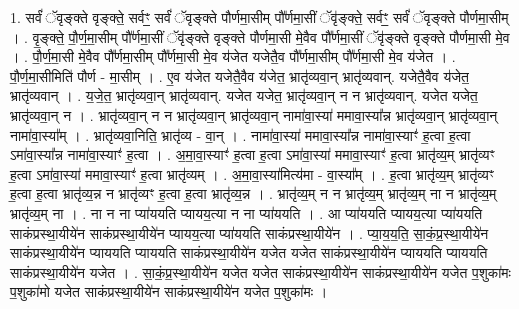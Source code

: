 \documentclass[17pt]{extarticle}
\begin{document}
1. सर्वं॑ ॅवृङ्क्ते वृङ्क्ते॒ सर्वꣳ॒॒ सर्वं॑ ॅवृङ्क्ते पौर्णमा॒सीम् पौ᳚र्णमा॒सीं ॅवृ॑ङ्क्ते॒ सर्वꣳ॒॒ सर्वं॑ ॅवृङ्क्ते पौर्णमा॒सीम् । . वृ॒ङ्क्ते॒ पौ॒र्ण॒मा॒सीम् पौ᳚र्णमा॒सीं ॅवृ॑ङ्क्ते वृङ्क्ते पौर्णमा॒सी मे॒वैव पौ᳚र्णमा॒सीं ॅवृ॑ङ्क्ते वृङ्क्ते पौर्णमा॒सी मे॒व । . पौ॒र्ण॒मा॒सी मे॒वैव पौ᳚र्णमा॒सीम् पौ᳚र्णमा॒सी मे॒व य॑जेत यजेतै॒व पौ᳚र्णमा॒सीम् पौ᳚र्णमा॒सी मे॒व य॑जेत । . पौ॒र्ण॒मा॒सीमिति॑ पौर्ण - मा॒सीम् । . ए॒व य॑जेत यजेतै॒वैव य॑जेत॒ भ्रातृ॑व्यवा॒न् भ्रातृ॑व्यवान्. यजेतै॒वैव य॑जेत॒ भ्रातृ॑व्यवान् । . य॒जे॒त॒ भ्रातृ॑व्यवा॒न् भ्रातृ॑व्यवान्. यजेत यजेत॒ भ्रातृ॑व्यवा॒न् न न भ्रातृ॑व्यवान्. यजेत यजेत॒ भ्रातृ॑व्यवा॒न् न । . भ्रातृ॑व्यवा॒न् न न भ्रातृ॑व्यवा॒न् भ्रातृ॑व्यवा॒न् नामा॑वा॒स्या॑ ममावा॒स्या᳚न्न भ्रातृ॑व्यवा॒न् भ्रातृ॑व्यवा॒न् नामा॑वा॒स्या᳚म् । . भ्रातृ॑व्यवा॒निति॒ भ्रातृ॑व्य - वा॒न् । . नामा॑वा॒स्या॑ ममावा॒स्या᳚न्न नामा॑वा॒स्याꣳ॑ ह॒त्वा ह॒त्वा ऽमा॑वा॒स्या᳚न्न नामा॑वा॒स्याꣳ॑ ह॒त्वा । . अ॒मा॒वा॒स्याꣳ॑ ह॒त्वा ह॒त्वा ऽमा॑वा॒स्या॑ ममावा॒स्याꣳ॑ ह॒त्वा भ्रातृ॑व्य॒म् भ्रातृ॑व्यꣳ ह॒त्वा ऽमा॑वा॒स्या॑ ममावा॒स्याꣳ॑ ह॒त्वा भ्रातृ॑व्यम् । . अ॒मा॒वा॒स्या॑मित्य॑मा - वा॒स्या᳚म् । . ह॒त्वा भ्रातृ॑व्य॒म् भ्रातृ॑व्यꣳ ह॒त्वा ह॒त्वा भ्रातृ॑व्य॒न्न न भ्रातृ॑व्यꣳ ह॒त्वा ह॒त्वा भ्रातृ॑व्य॒न्न । . भ्रातृ॑व्य॒म् न न भ्रातृ॑व्य॒म् भ्रातृ॑व्य॒म् ना न भ्रातृ॑व्य॒म् भ्रातृ॑व्य॒म् ना । . ना न ना प्या॑ययति प्यायय॒त्या न ना प्या॑ययति । . आ प्या॑ययति प्यायय॒त्या प्या॑ययति साकंप्रस्था॒यीये॑न साकंप्रस्था॒यीये॑न प्यायय॒त्या प्या॑ययति साकंप्रस्था॒यीये॑न । . प्या॒य॒य॒ति॒ सा॒कं॒प्र॒स्था॒यीये॑न साकंप्रस्था॒यीये॑न प्याययति प्याययति साकंप्रस्था॒यीये॑न यजेत यजेत साकंप्रस्था॒यीये॑न प्याययति प्याययति साकंप्रस्था॒यीये॑न यजेत । . सा॒कं॒प्र॒स्था॒यीये॑न यजेत यजेत साकंप्रस्था॒यीये॑न साकंप्रस्था॒यीये॑न यजेत प॒शुका॑मः प॒शुका॑मो यजेत साकंप्रस्था॒यीये॑न साकंप्रस्था॒यीये॑न यजेत प॒शुका॑मः । \newline
\end{document}
